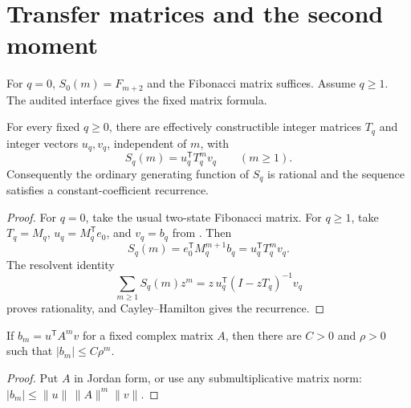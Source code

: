 \section{Transfer matrices and the second moment}
\label{sec:transfer}

For \(q=0\), \(S_0(m)=F_{m+2}\) and the Fibonacci matrix suffices.  Assume
\(q\ge1\).  The audited interface gives the fixed matrix formula.

\begin{theorem}
\label{thm:intrinsic-fold-moment-transfer}
For every fixed \(q\ge0\), there are effectively constructible integer
matrices \(T_q\) and integer vectors \(u_q,v_q\), independent of \(m\), with
\[
 S_q(m)=u_q^{\mathsf T}T_q^m v_q\qquad(m\ge1).
\]
Consequently the ordinary generating function of \(S_q\) is rational and the
sequence satisfies a constant-coefficient recurrence.
\end{theorem}
\begin{proof}
For \(q=0\), take the usual two-state Fibonacci matrix.  For \(q\ge1\), take
\(T_q=M_q\), \(u_q=M_q^{\mathsf T}e_0\), and \(v_q=b_q\) from
.  Then
\[
 S_q(m)=e_0^{\mathsf T}M_q^{m+1}b_q
       =u_q^{\mathsf T}T_q^m v_q .
\]
The resolvent identity
\[
 \sum_{m\ge1}S_q(m)z^m
 =z\,u_q^{\mathsf T}(I-zT_q)^{-1}v_q
\]
proves rationality, and Cayley--Hamilton gives the recurrence.
\end{proof}

\begin{proposition}
\label{prop:fixed-transfer-interface-budget}
If \(b_m=u^{\mathsf T}A^mv\) for a fixed complex matrix \(A\), then
there are \(C>0\) and \(\rho>0\) such that \(|b_m|\le C\rho^m\).
\end{proposition}
\begin{proof}
Put \(A\) in Jordan form, or use any submultiplicative matrix norm:
\(|b_m|\le\|u\|\,\|A\|^m\|v\|\).
\end{proof}

